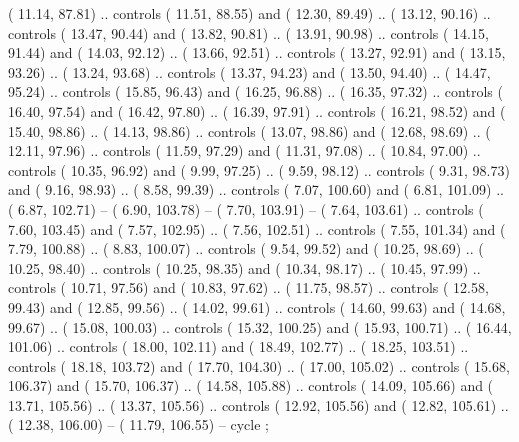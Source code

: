 {        (  11.14,  87.81) .. controls (  11.51,  88.55) and (  12.30,  89.49) ..
        (  13.12,  90.16) .. controls (  13.47,  90.44) and (  13.82,  90.81) ..
        (  13.91,  90.98) .. controls (  14.15,  91.44) and (  14.03,  92.12) ..
        (  13.66,  92.51) .. controls (  13.27,  92.91) and (  13.15,  93.26) ..
        (  13.24,  93.68) .. controls (  13.37,  94.23) and (  13.50,  94.40) ..
        (  14.47,  95.24) .. controls (  15.85,  96.43) and (  16.25,  96.88) ..
        (  16.35,  97.32) .. controls (  16.40,  97.54) and (  16.42,  97.80) ..
        (  16.39,  97.91) .. controls (  16.21,  98.52) and (  15.40,  98.86) ..
        (  14.13,  98.86) .. controls (  13.07,  98.86) and (  12.68,  98.69) ..
        (  12.11,  97.96) .. controls (  11.59,  97.29) and (  11.31,  97.08) ..
        (  10.84,  97.00) .. controls (  10.35,  96.92) and (   9.99,  97.25) ..
        (   9.59,  98.12) .. controls (   9.31,  98.73) and (   9.16,  98.93) ..
        (   8.58,  99.39) .. controls (   7.07, 100.60) and (   6.81, 101.09) ..
        (   6.87, 102.71) -- 
        (   6.90, 103.78) -- 
        (   7.70, 103.91) -- 
        (   7.64, 103.61) .. controls (   7.60, 103.45) and (   7.57, 102.95) ..
        (   7.56, 102.51) .. controls (   7.55, 101.34) and (   7.79, 100.88) ..
        (   8.83, 100.07) .. controls (   9.54,  99.52) and (  10.25,  98.69) ..
        (  10.25,  98.40) .. controls (  10.25,  98.35) and (  10.34,  98.17) ..
        (  10.45,  97.99) .. controls (  10.71,  97.56) and (  10.83,  97.62) ..
        (  11.75,  98.57) .. controls (  12.58,  99.43) and (  12.85,  99.56) ..
        (  14.02,  99.61) .. controls (  14.60,  99.63) and (  14.68,  99.67) ..
        (  15.08, 100.03) .. controls (  15.32, 100.25) and (  15.93, 100.71) ..
        (  16.44, 101.06) .. controls (  18.00, 102.11) and (  18.49, 102.77) ..
        (  18.25, 103.51) .. controls (  18.18, 103.72) and (  17.70, 104.30) ..
        (  17.00, 105.02) .. controls (  15.68, 106.37) and (  15.70, 106.37) ..
        (  14.58, 105.88) .. controls (  14.09, 105.66) and (  13.71, 105.56) ..
        (  13.37, 105.56) .. controls (  12.92, 105.56) and (  12.82, 105.61) ..
        (  12.38, 106.00) -- 
        (  11.79, 106.55) -- 
        cycle ;
}

